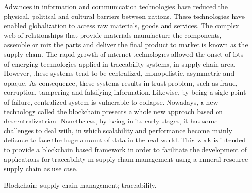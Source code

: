 \abstract
Advances in information and communication technologies have reduced the physical, political and cultural barriers between nations. These technologies have enabled globalization to access raw materials, goods and services. The complex web of relationships that provide materials manufacture the components, assemble or mix the parts and deliver the final product to market is known as the supply chain. The rapid growth of internet technologies allowed the onset of  lots of emerging technologies applied in traceability systems, in supply chain area. However, these systems tend to be centralized, monopolistic, asymmetric and opaque. As consequence, these systems results in trust problem, such as fraud, corruption, tampering and falsifying information. Likewise, by being a sigle point of failure, centralized system is vulnerable to collapse. Nowadays, a new technology called the blockchain presents a whole new approach based on descentralizatrion. Nonetheless, by being in its early stages, it has some challenges to deal with, in which scalability and performance become  mainly  defiance to face the huge amount of data in the real world. This work is intended to provide a blockchain based framework in order to facilitate the development of applications for traceability in supply chain management using a mineral resource supply chain as use case.

\begin{keywords}
Blockchain; supply chain management; traceability.
\end{keywords}
